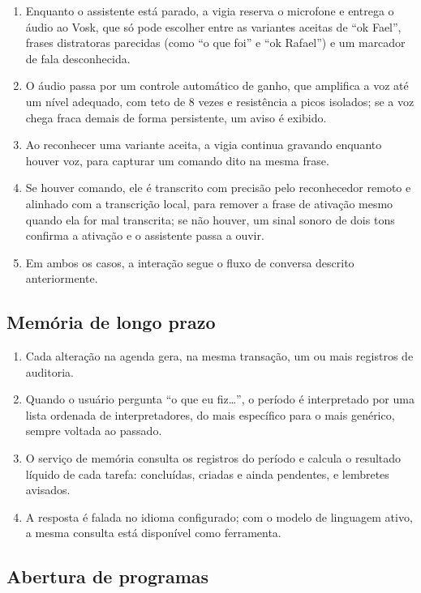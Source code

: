 \begin{enumerate}[label=\arabic*.]
  \item Enquanto o assistente está parado, a vigia reserva o microfone e entrega o áudio ao Vosk, que só
        pode escolher entre as variantes aceitas de “ok Fael”, frases distratoras parecidas (como “o que
        foi” e “ok Rafael”) e um marcador de fala desconhecida.
  \item O áudio passa por um controle automático de ganho, que amplifica a voz até um nível adequado,
        com teto de 8 vezes e resistência a picos isolados; se a voz chega fraca demais de forma
        persistente, um aviso é exibido.
  \item Ao reconhecer uma variante aceita, a vigia continua gravando enquanto houver voz, para capturar
        um comando dito na mesma frase.
  \item Se houver comando, ele é transcrito com precisão pelo reconhecedor remoto e alinhado com a
        transcrição local, para remover a frase de ativação mesmo quando ela for mal transcrita; se não
        houver, um sinal sonoro de dois tons confirma a ativação e o assistente passa a ouvir.
  \item Em ambos os casos, a interação segue o fluxo de conversa descrito anteriormente.
\end{enumerate}

\subsection{Memória de longo prazo}

\begin{enumerate}[label=\arabic*.]
  \item Cada alteração na agenda gera, na mesma transação, um ou mais registros de auditoria.
  \item Quando o usuário pergunta “o que eu fiz…”, o período é interpretado por uma lista ordenada de
        interpretadores, do mais específico para o mais genérico, sempre voltada ao passado.
  \item O serviço de memória consulta os registros do período e calcula o resultado líquido de cada
        tarefa: concluídas, criadas e ainda pendentes, e lembretes avisados.
  \item A resposta é falada no idioma configurado; com o modelo de linguagem ativo, a mesma consulta
        está disponível como ferramenta.
\end{enumerate}

\subsection{Abertura de programas}

